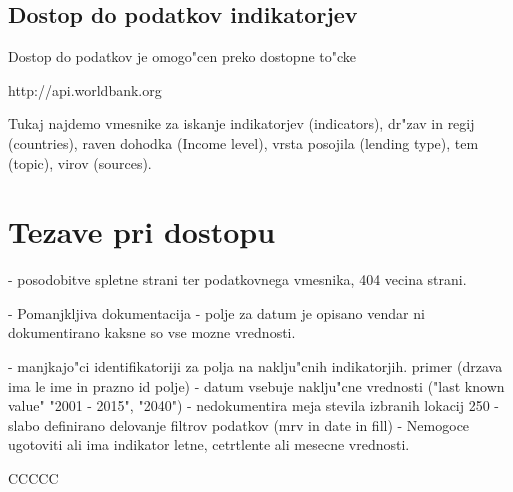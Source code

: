 \subsection{Dostop do podatkov indikatorjev}

Dostop do podatkov je omogo"cen preko dostopne to"cke

http://api.worldbank.org

Tukaj najdemo vmesnike za iskanje indikatorjev (indicators), dr"zav in regij
(countries), raven dohodka (Income level), vrsta posojila (lending type), tem
(topic), virov (sources).





\section{Tezave pri dostopu}

- posodobitve spletne strani ter podatkovnega vmesnika, 404 vecina strani.

- Pomanjkljiva dokumentacija
    - polje za datum je opisano vendar ni dokumentirano kaksne so vse mozne
      vrednosti. 

- manjkajo"ci identifikatoriji za polja na naklju"cnih indikatorjih.
  primer (drzava ima le ime in prazno id polje)
- datum vsebuje naklju"cne vrednosti ("last known value" "2001 - 2015", "2040")
- nedokumentira meja stevila izbranih lokacij 250
- slabo definirano delovanje filtrov podatkov (mrv in date in fill)
- Nemogoce ugotoviti ali ima indikator letne, cetrtlente ali mesecne vrednosti.



CCCCC

